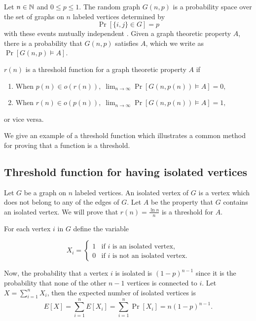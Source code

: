 Let $n \in \mathbb{N}$ and $0 \leq p \leq 1$. The random graph $G(n, p)$ is a probability space over the set of graphs on $n$ labeled vertices determined by
\[\Pr[\{i, j\} \in G] = p\] 
with these events mutually independent \cite{alon2016probabilistic}. Given a graph theoretic property $A$, there is a probability that $G(n, p)$ satisfies $A$, which we write as $\Pr[G(n, p) \vDash A]$. 

\begin{definition}
    $r(n)$ is a threshold function for a graph theoretic property $A$ if 
    \begin{enumerate}
        \item When \(p(n) \in o(r(n)), \; \lim_{n \to \infty} \Pr[G(n, p(n)) \vDash A] = 0,\)
        \item When \(r(n) \in o(p(n)), \;  \lim_{n \to \infty} \Pr[G(n, p(n)) \vDash A] = 1,\) 
    \end{enumerate}
    or vice versa. \cite{alon2016probabilistic}
\end{definition}

We give an example of a threshold function which illustrates a common method for proving that a function is a threshold. \par

\subsection{Threshold function for having isolated vertices}

Let $G$ be a graph on $n$ labeled vertices. An isolated vertex of $G$ is a vertex which does not belong to any of the edges of $G$. Let $A$ be the property that $G$ contains an isolated vertex. We will prove that $\displaystyle{r(n) = \frac{\ln n}{n}}$ is a threshold for $A$. \par

For each vertex $i$ in $G$ define the variable 

\[X_i = 
\left\{
	\begin{array}{ll}
		1  & \mbox{if } i \text{ is an isolated vertex,} \\
		0 & \mbox{if } i \text{ is not an isolated vertex.}
	\end{array}
\right.
\]

Now, the probability that a vertex $i$ is isolated is $(1 - p)^{n - 1}$ since it is the probability that none of the other $n - 1$ vertices is connected to $i$. Let $X = \sum_{i = 1}^n X_i$, then the expected number of isolated vertices is
 \[E[X] = \sum_{i = 1}^{n} E[X_i] = \sum_{i = 1}^{n} \Pr[X_i] = n(1 - p)^{n - 1}.\]

